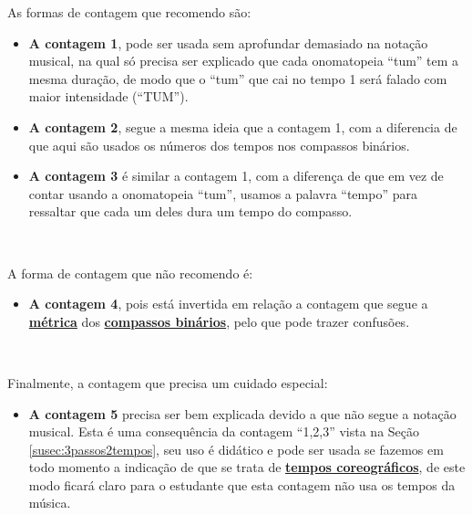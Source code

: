As formas de contagem que recomendo são:
\begin{itemize}
\item \textbf{A contagem 1}, pode ser usada sem aprofundar demasiado 
na notação musical, na qual só precisa ser explicado que cada onomatopeia ``tum'' tem a mesma duração,
de modo que  o ``tum'' que cai no tempo 1 será falado com maior intensidade (``TUM'').
\item \textbf{A contagem 2}, segue a mesma ideia que a contagem 1, 
com a diferencia de que aqui são usados os números dos tempos nos compassos binários.
\item \textbf{A contagem 3} 
é similar a contagem 1, 
com a diferença de que em vez de contar usando a onomatopeia ``tum'',
usamos a palavra ``tempo'' para ressaltar que cada um deles dura um tempo do compasso. 
\end{itemize}~

A forma de contagem que não recomendo é:
\begin{itemize}
\item \textbf{A contagem 4}, pois está invertida em relação a contagem que segue a 
\hyperref[def:Metrica]{\textbf{métrica}} dos \hyperref[subsec:compassobinario]{\textbf{compassos binários}},
pelo que pode trazer confusões.
\end{itemize}~

Finalmente, a contagem que precisa um cuidado especial:
\begin{itemize}
\item \textbf{A contagem 5} precisa ser bem explicada 
devido a que não segue a notação musical. 
Esta é uma consequência da contagem ``1,2,3'' vista na Seção \ref{susec:3passos2tempos}, 
seu uso é didático e pode ser usada se fazemos em todo momento a indicação de 
que se trata de \hyperref[sec:TemposCoreograficos]{\textbf{tempos coreográficos}},
de este modo ficará claro para o estudante que esta contagem não usa os tempos da música.
\end{itemize}




